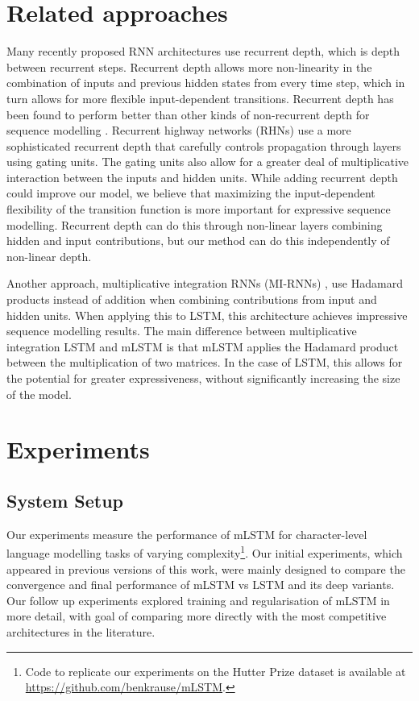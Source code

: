 \documentclass{article}
\begin{document}
\section{Related approaches}
Many recently proposed RNN architectures use recurrent depth, which is depth between recurrent steps. Recurrent depth allows more non-linearity in the combination of inputs and previous hidden states from every time step, which in turn allows for more flexible input-dependent transitions. Recurrent depth has been found to perform better than other kinds of non-recurrent depth for sequence modelling \citep{zhang2016}. Recurrent highway networks (RHNs) \citep{zilly2017} use a more sophisticated recurrent depth that carefully controls propagation through layers using gating units. The gating units also allow for a greater deal of multiplicative interaction between the inputs and hidden units. While adding recurrent depth could improve our model, we believe that maximizing the input-dependent flexibility of the transition function is more important for expressive sequence modelling. Recurrent depth can do this through non-linear layers combining hidden and input contributions, but our method can do this independently of non-linear depth.

 Another approach, multiplicative integration RNNs (MI-RNNs) \citep{wu2016}, use Hadamard products instead of addition when combining contributions from input and hidden units. When applying this to LSTM, this architecture achieves impressive sequence modelling results. The main difference between multiplicative integration LSTM and mLSTM is that mLSTM applies the Hadamard product between the multiplication of two matrices. In the case of LSTM, this allows for the potential for greater expressiveness, without significantly increasing the size of the model. 


\section{Experiments}


\subsection{System Setup}

Our experiments measure the performance of mLSTM for character-level language modelling tasks of varying complexity\footnote{Code to replicate our experiments on the Hutter Prize dataset is available at \url{https://github.com/benkrause/mLSTM}.}. Our initial experiments, which appeared in previous versions of this work, were mainly designed to compare the convergence and final performance of mLSTM vs LSTM and its deep variants. Our follow up experiments explored training and regularisation of mLSTM in more detail, with goal of comparing more directly with the most competitive architectures in the literature. 
\end{document}
